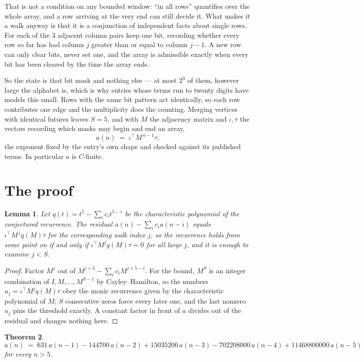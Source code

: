 \documentclass[11pt,a4paper]{article}
\theoremstyle{plain}
\newtheorem{theorem}{Theorem}
\newtheorem{lemma}[theorem]{Lemma}
\theoremstyle{definition}
\begin{document}
That is not a condition on any bounded window: ``in all rows'' quantifies over the whole array, and a row arriving at the very end can still decide it. What makes it a walk anyway is that it is a conjunction of independent facts about single rows. For each of the $3$ adjacent column pairs keep one bit, recording whether every row so far has had column $j$ greater than or equal to column $j-1$. A new row can only clear bits, never set one, and the array is admissible exactly when every bit has been cleared by the time the array ends.

So the state is that bit mask and nothing else --- at most $2^{3}$ of them, however large the alphabet is, which is why entries whose terms run to twenty digits have models this small. Rows with the same bit pattern act identically, so each row contributes one edge and the multiplicity does the counting. Merging vertices with identical futures leaves $S=5$, and with $M$ the adjacency matrix and $\iota,\tau$ the vectors recording which masks may begin and end an array,
\[
a(n)\;=\;\iota^{\!\top}M^{\,n-1}\tau ,
\]
the exponent fixed by the entry's own shape and checked against its published terms. In
particular $a$ is $C$-finite.

\section{The proof}

\begin{lemma}\label{lem:crit}
Let $q(t)=t^{5}-\sum_i c_it^{5-i}$ be the characteristic polynomial of the
conjectured recurrence. The residual $a(n)-\sum_ic_ia(n-i)$ equals
$\iota^{\!\top}M^{\,j}q(M)\tau$ for the corresponding walk index $j$, so the recurrence
holds from some point on if and only if $\iota^{\!\top}M^{j}q(M)\tau=0$ for all large $j$,
and it is enough to examine $j<S$.
\end{lemma}

\begin{proof}
Factor $M^{j}$ out of $M^{j+5}-\sum_ic_iM^{j+5-i}$. For the bound, $M^{S}$
is an integer combination of $I,M,\dots,M^{S-1}$ by Cayley--Hamilton, so the numbers
$u_j=\iota^{\!\top}M^{j}q(M)\tau$ obey the monic recurrence given by the characteristic
polynomial of $M$; $S$ consecutive zeros force every later one, and the last nonzero $u_j$
pins the threshold exactly. A constant factor in front of $a$ divides out of the residual and
changes nothing here.
\end{proof}

\begin{theorem}
\[
a(n)\;=\;631\,a(n-1) - 144700\,a(n-2) + 15035200\,a(n-3) - 702208000\,a(n-4) + 11468800000\,a(n-5)
\]
for every $n>5$.
\end{theorem}
\end{document}
